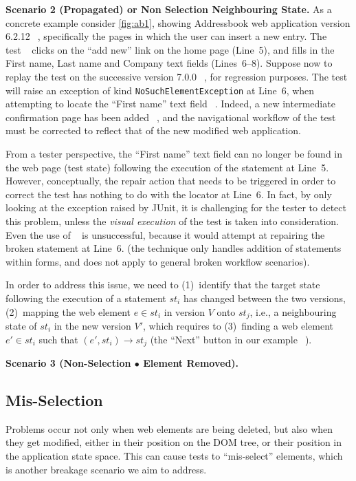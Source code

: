 \noindent
\textbf{Scenario 2 (Propagated) or Non Selection Neighbouring State.} 
As a concrete example consider \autoref{fig:ab1}, showing Addressbook web application version 6.2.12~\textcircled{}, specifically the pages in which the user can insert a new entry. The test~\textcircled{} clicks on the ``add new'' link on the home page (Line~5), and fills in the First name, Last name and Company text fields (Lines~6--8).
Suppose now to replay the test on the successive version 7.0.0~\textcircled{}, for regression purposes. The test will raise an exception of kind \texttt{NoSuchElementException} at Line~6, when attempting to locate the ``First name'' text field~\textcircled{}. 
Indeed, a new intermediate confirmation page has been added~\textcircled{}, and the navigational workflow of the test must be corrected to reflect that of the new modified web application.

From a tester perspective, the ``First name'' text field can no longer be found in the web page (test state) following the execution of the statement at Line~5. However, conceptually, the repair action that needs to be triggered in order to correct the test has nothing to do with the locator at Line~6.
In fact, by only looking at the exception raised by JUnit, it is  challenging for the tester to detect this problem, unless the \textit{visual execution} of the test is taken into consideration.
%
Even the use of \water~\cite{Choudhary:2011:WWA:2002931.2002935} is unsuccessful, because it would attempt at repairing the broken statement at Line~6. (the technique only handles addition of statements within forms, and does not apply to general broken workflow scenarios).

In order to address this issue, we need to (1)~identify that the target state following the execution of a statement $st_i$ has changed between the two versions, (2)~mapping the web element $e \in st_i$ in version $V$ onto $st_j$, i.e., a neighbouring state of $st_i$  in the new version $V'$, which requires to (3)~finding  a web element $e' \in st_i$ such that $(e', st_i) \rightarrow st_j$ (the ``Next'' button in our example~\textcircled{}).

\noindent
\textbf{Scenario 3 (Non-Selection $\bullet$ Element Removed).} 

\subsection{Mis-Selection}\label{sec:misselection}
Problems occur not only when web elements are being deleted, but also when they get modified, either in their position on the DOM tree, or their position in the application state space. This can cause tests to ``mis-select'' elements, which is another breakage scenario we aim to address.


